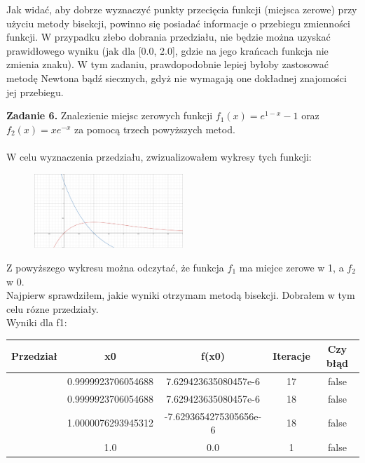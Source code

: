 \documentclass[15pt, a4paper]{article}
\begin{document}
\noindent Jak widać, aby dobrze wyznaczyć punkty przecięcia funkcji (miejsca zerowe) przy użyciu metody bisekcji, powinno się posiadać informacje o przebiegu zmienności funkcji. W przypadku złebo dobrania przedziału, nie będzie można uzyskać prawidłowego wyniku (jak dla [0.0, 2.0], gdzie na jego krańcach funkcja nie zmienia znaku). W tym zadaniu, prawdopodobnie lepiej byłoby zastosować metodę Newtona bądź siecznych, gdyż nie wymagają one dokładnej znajomości jej przebiegu.


\vspace{0.5cm}

\noindent\hrulefill

\vspace{0.5cm}


\noindent\textbf{Zadanie 6.} Znalezienie miejsc zerowych funkcji \( f_1(x) = e^{1-x} - 1 \) oraz \(f_2(x) = xe^{-x}\) za pomocą trzech powyższych metod.\\\\
\noindent W celu wyznaczenia przedziału, zwizualizowałem wykresy tych funkcji: \\

\begin{figure}[h]
    \centering
    \includegraphics[width=0.5\textwidth]{img/wykreszad6.png}
\end{figure}

\noindent Z powyższego wykresu można odczytać, że funkcja \(f_1 \) ma miejce zerowe w 1, a \(f_2\) w 0.\\ 

\noindent Najpierw sprawdziłem, jakie wyniki otrzymam metodą bisekcji. Dobrałem w tym celu rózne przedziały.\\

\noindent Wyniki dla f1:
\begin{table}[ht]
\begin{adjustbox}{max width=\textwidth}
\begin{tabular}{|c|c|c|c|c|}
    \hline
    \textbf{Przedział} & \textbf{x0} & \textbf{f(x0)} & \textbf{Iteracje} & \textbf{Czy błąd} \\
    \hline
    [0.0, 1.0] & 0.9999923706054688 & 7.629423635080457e-6 & 17 & false \\
    \hline
    [-1.0, 1.0] & 0.9999923706054688 & 7.629423635080457e-6 & 18 & false \\
    \hline
    [-3.0, 3.0] & 1.0000076293945312 & -7.6293654275305656e-6 & 18 & false \\
    \hline
    [-0.0, 2.0] & 1.0 & 0.0 & 1 & false \\
    \hline
\end{tabular}
\end{adjustbox}
\end{table}
\end{document}
